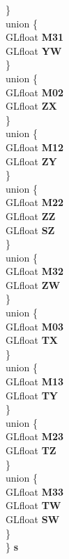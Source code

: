\begin{DoxyCompactItemize}
\begin{tabbing}
\>\} \label{structMatrix4f__t_1_1@22_a7b7472b56c32a3c4f4558833146ca386}
\\
\>union \{\\
\>\>GLfloat {\bfseries M31}\\
\>\>GLfloat {\bfseries YW}\\
\>\} \label{structMatrix4f__t_1_1@22_acf430cf0621c5327059cc433a6fc2a92}
\\
\>union \{\\
\>\>GLfloat {\bfseries M02}\\
\>\>GLfloat {\bfseries ZX}\\
\>\} \label{structMatrix4f__t_1_1@22_af2f6da271fd7ceaed0faac54e55eb67d}
\\
\>union \{\\
\>\>GLfloat {\bfseries M12}\\
\>\>GLfloat {\bfseries ZY}\\
\>\} \label{structMatrix4f__t_1_1@22_ad9ed182073eb937fc0322f886db13100}
\\
\>union \{\\
\>\>GLfloat {\bfseries M22}\\
\>\>GLfloat {\bfseries ZZ}\\
\>\>GLfloat {\bfseries SZ}\\
\>\} \label{structMatrix4f__t_1_1@22_a26d0c03f42b871691c1a539925919800}
\\
\>union \{\\
\>\>GLfloat {\bfseries M32}\\
\>\>GLfloat {\bfseries ZW}\\
\>\} \label{structMatrix4f__t_1_1@22_a1fd317e5fe5413272f22d2eddc91535f}
\\
\>union \{\\
\>\>GLfloat {\bfseries M03}\\
\>\>GLfloat {\bfseries TX}\\
\>\} \label{structMatrix4f__t_1_1@22_a80e2d5eae7f0fbd309fd0736803876ee}
\\
\>union \{\\
\>\>GLfloat {\bfseries M13}\\
\>\>GLfloat {\bfseries TY}\\
\>\} \label{structMatrix4f__t_1_1@22_afa0eec156dd85c16c540871e57fc386a}
\\
\>union \{\\
\>\>GLfloat {\bfseries M23}\\
\>\>GLfloat {\bfseries TZ}\\
\>\} \label{structMatrix4f__t_1_1@22_a98fb5a8b396ecd104ae43a9f8adc56aa}
\\
\>union \{\\
\>\>GLfloat {\bfseries M33}\\
\>\>GLfloat {\bfseries TW}\\
\>\>GLfloat {\bfseries SW}\\
\>\} \label{structMatrix4f__t_1_1@22_a0edbb13d2db6b107816389efefacecf1}
\\
\} {\bfseries s}\label{unionMatrix4f__t_abcc8d4cea1b329312595f9d5a4d3ee07}
\\


\end{tabbing}
\end{DoxyCompactItemize}
